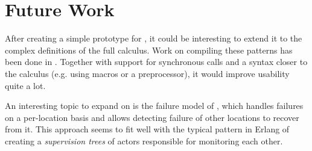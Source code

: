 \section{Future Work}

After creating a simple prototype for \corejoincalc,
it could be interesting to extend it to the complex definitions
of the full calculus.
Work on compiling these patterns has been done in \cite{maranget_compiling_1998}.
Together with support for synchronous calls and a syntax closer to the calculus
(e.g. using macros or a preprocessor), it would improve usability quite a lot.

An interesting topic to expand on is the failure model of \distjoincalc
\cite{fournet_calculus_1996}, which handles failures on a per-location basis
and allows detecting failure of other locations to recover from it.
This approach seems to fit well with the typical pattern in Erlang of creating a
\emph{supervision trees} of actors responsible for monitoring each other.
